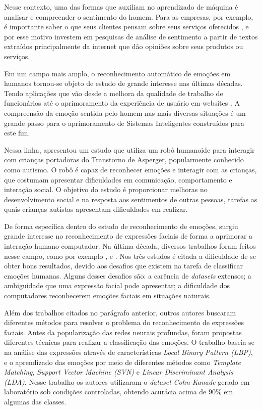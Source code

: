 \documentclass[
12pt,       %
openright,      %
oneside,      %
a4paper,      %
english,      %
french,       %
spanish,      %
brazil        %
]{abntex2}
\begin{document}
Nesse contexto, uma das formas que auxiliam no aprendizado de máquina é analisar e compreender o sentimento do homem. Para as empresas, por exemplo, é importante saber o que seus clientes pensam sobre seus serviços oferecidos \cite{pang2008opinion}, e por esse motivo investem em pesquisas de análise de sentimento a partir de textos extraídos principalmente da internet que dão opiniões sobre seus produtos ou serviços.

Em um campo mais amplo, o reconhecimento automático de emoções em humanos tornou-se objeto de estudo de grande interesse nas últimas décadas. Tendo aplicações que vão desde a melhora da qualidade de trabalho de funcionários até o aprimoramento da experiência de usuário em websites \cite{kolakowska2014emotion}. A compreensão da emoção sentida pelo homem nas mais diversas situações é um grande passo para o aprimoramento de Sistemas Inteligentes construídos para este fim.

Nessa linha,  apresentou um estudo que utiliza um robô humanoide para interagir com crianças portadoras do Transtorno de Asperger, popularmente conhecido como autismo. O robô é capaz de reconhecer emoções e interagir com as crianças, que costumam apresentar dificuldades em comunicação, comportamento e interação social. O objetivo do estudo é proporcionar melhoras no desenvolvimento social e na resposta aos sentimentos de outras pessoas, tarefas as quais crianças autistas apresentam dificuldades em realizar.

De forma específica dentro do estudo de reconhecimento de emoções, surgiu grande interesse no reconhecimento de expressões faciais de forma a aprimorar a interação humano-computador. Na última década, diversos trabalhos foram feitos nesse campo, como por exemplo \cite{sarode2010facial}, \cite{manglik2004facial} e \cite{bartlett2003real}. Nos três estudos é citada a dificuldade de se obter bons resultados, devido aos desafios que existem na tarefa de classificar emoções humanas. Alguns desses desafios são: a carência de \textit{datasets} extensos; a ambiguidade que uma expressão facial pode apresentar; a dificuldade dos computadores reconhecerem emoções faciais em situações naturais.
    
Além dos trabalhos citados no parágrafo anterior, outros autores buscaram diferentes métodos para resolver o problema do reconhecimento de expressões faciais. Antes da popularização das redes neurais profundas,  foram propostas diferentes técnicas para realizar a classificação das emoções. O trabalho \cite{shan2009facial} baseia-se na análise das expressões através de características \textit{Local Binary Pattern (LBP)}, e o aprendizado das emoções por meio de diferentes métodos como \textit{Template Matching}, \textit{Support Vector Machine (SVN)} e \textit{Linear Discriminant Analysis (LDA)}. Nesse trabalho os autores utilizaram o \textit{dataset} \textit{Cohn-Kanade} \cite{kanade2000comprehensive} gerado em laboratório sob condições controladas, obtendo acurácia acima de 90\% em algumas das classes.
\end{document}

